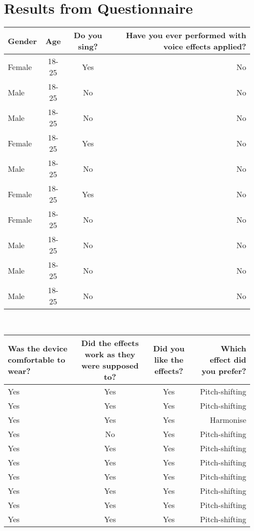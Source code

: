 \section{Results from Questionnaire}\label{AX}

\begin{tabular}{| l | c | c | r | }
\hline
Gender & Age & Do you sing? & Have you ever performed with voice effects applied? \\ \hline
Female & 18-25 & Yes & No \\ \hline
Male & 18-25 & No & No \\ \hline
Male & 18-25 & No & No \\ \hline
Female & 18-25 & Yes & No \\ \hline
Male & 18-25 & No & No \\ \hline
Female & 18-25 & Yes & No \\ \hline
Female & 18-25 & No & No \\ \hline
Male & 18-25 & No & No \\ \hline
Male & 18-25 & No & No \\ \hline
Male & 18-25 & No & No \\ \hline
\end{tabular}\\

\begin{tabular}{| l | c | c | r |}
\hline
Was the device comfortable to wear? & Did the effects work as they were supposed to? & Did you like the effects? & Which effect did you prefer? \\ \hline
Yes & Yes & Yes & Pitch-shifting \\ \hline
Yes & Yes & Yes & Pitch-shifting \\ \hline
Yes & Yes & Yes & Harmonise \\ \hline
Yes & No & Yes & Pitch-shifting \\ \hline
Yes & Yes & Yes & Pitch-shifting \\ \hline
Yes & Yes & Yes & Pitch-shifting \\ \hline
Yes & Yes & Yes & Pitch-shifting \\ \hline
Yes & Yes & Yes & Pitch-shifting \\ \hline
Yes & Yes & Yes & Pitch-shifting \\ \hline
Yes & Yes & Yes & Pitch-shifting \\ \hline
\end{tabular}\\

